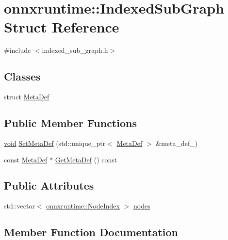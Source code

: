 \hypertarget{structonnxruntime_1_1IndexedSubGraph}{}\section{onnxruntime\+:\+:Indexed\+Sub\+Graph Struct Reference}
\label{structonnxruntime_1_1IndexedSubGraph}


{\ttfamily \#include $<$indexed\+\_\+sub\+\_\+graph.\+h$>$}

\subsection*{Classes}
\begin{DoxyCompactItemize}
\item 
struct \mbox{\hyperlink{structonnxruntime_1_1IndexedSubGraph_1_1MetaDef}{Meta\+Def}}
\end{DoxyCompactItemize}
\subsection*{Public Member Functions}
\begin{DoxyCompactItemize}
\item 
\mbox{\hyperlink{mlasi_8h_a88f941d423cb2a819b70a1358982b1a6}{void}} \mbox{\hyperlink{structonnxruntime_1_1IndexedSubGraph_a25334eec39bc19a5f70d71c939f38ebf}{Set\+Meta\+Def}} (std\+::unique\+\_\+ptr$<$ \mbox{\hyperlink{structonnxruntime_1_1IndexedSubGraph_1_1MetaDef}{Meta\+Def}} $>$ \&meta\+\_\+def\+\_\+)
\item 
const \mbox{\hyperlink{structonnxruntime_1_1IndexedSubGraph_1_1MetaDef}{Meta\+Def}} $\ast$ \mbox{\hyperlink{structonnxruntime_1_1IndexedSubGraph_a25ea680fed95ab77ce13959f7e084d54}{Get\+Meta\+Def}} () const
\end{DoxyCompactItemize}
\subsection*{Public Attributes}
\begin{DoxyCompactItemize}
\item 
std\+::vector$<$ \mbox{\hyperlink{namespaceonnxruntime_af8773b5c12b5d8fd9292eb2e268df760}{onnxruntime\+::\+Node\+Index}} $>$ \mbox{\hyperlink{structonnxruntime_1_1IndexedSubGraph_aa3c149071e4eaf87884df02ae5da7374}{nodes}}
\end{DoxyCompactItemize}


\subsection{Member Function Documentation}
\mbox{\label{structonnxruntime_1_1IndexedSubGraph_a25ea680fed95ab77ce13959f7e084d54}} 
